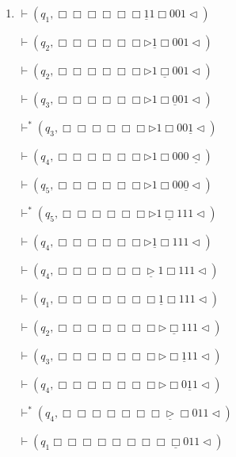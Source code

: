 \documentclass[12pt,a4paper]{article}
\makeatletter
\newtheorem*{solution}{Solution}
\theoremstyle{definition}
\renewenvironment{solution}[1][Solution] {\par\pushQED{\qed}\normalfont\topsep6\p@\@plus6\p@\relax\trivlist\item[\hskip\labelsep\bfseries#1\@addpunct{.}]\ignorespaces}{\popQED\endtrivlist\@endpefalse} \makeatother
\makeatother
\begin{document}
\begin{enumerate}
\begin{solution}
\begin{enumerate}
\begin{minipage}{0.27\textwidth}
\begin{center}
				$\vdash (q_1,\Box \Box \Box\Box\Box\Box\underline{1} 1 \Box 0 0 1\triangleleft)$
			\end{center}
		\end{minipage}
		\begin{minipage}{0.3\textwidth}
			\begin{center}
				$\vdash (q_2,\Box \Box \Box\Box\Box\Box\triangleright\underline{1} \Box 0 0 1\triangleleft)$
				
				$\vdash (q_2,\Box \Box \Box\Box\Box\Box\triangleright1\underline{\Box}0 0 1\triangleleft)$
				
				$\vdash (q_3,\Box \Box \Box\Box\Box\Box\triangleright1 \Box \underline{0} 0  1   \triangleleft)$
				
				$\vdash^* (q_3,\Box \Box \Box\Box\Box\Box\triangleright1 \Box 0 0\underline{1}  \triangleleft)$
				
				$\vdash (q_4,\Box \Box \Box\Box\Box\Box\triangleright1 \Box 0 0 0\underline{\triangleleft})$
				
				
				$\vdash (q_5,\Box \Box \Box\Box\Box\Box\triangleright1 \Box 0 0 \underline{0}\triangleleft)$
				
				$\vdash^* (q_5,\Box \Box \Box\Box\Box\Box\triangleright1 \underline{\Box} 1 1 1\triangleleft)$
				
				$\vdash (q_4,\Box \Box \Box\Box\Box\Box\triangleright\underline{1} \Box 1 1 1\triangleleft)$
				
				$\vdash (q_4,\Box \Box \Box\Box\Box\Box\underline{\triangleright}  1 \Box111\triangleleft)$
				
				
				$\vdash (q_1,\Box \Box \Box\Box\Box\Box\Box\underline{1}\Box111\triangleleft)$
				
				$\vdash (q_2,\Box \Box \Box\Box\Box\Box\Box\triangleright\underline{\Box}111\triangleleft)$
				
				$\vdash (q_3,\Box \Box \Box\Box\Box\Box\Box\triangleright\Box\underline{1}11\triangleleft)$
				
				$\vdash (q_4,\Box \Box \Box\Box\Box\Box\Box\triangleright\Box0\underline{1}1\triangleleft)$
				
				$\vdash^* (q_4,\Box \Box \Box\Box\Box\Box\Box\underline{\triangleright}\Box01 1\triangleleft)$
				
				
				$\vdash (q_1\Box \Box \Box\Box\Box\Box\Box\Box\underline{\Box}01 1\triangleleft)$
				

\end{center}
\end{minipage}
\end{enumerate}
\end{solution}
\end{enumerate}
\end{document}
